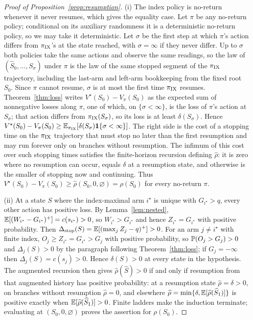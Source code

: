 \begin{proof}[Proof of Proposition~\ref{prop:resumption}]
(i) The index policy is no-return whenever it never resumes, which gives the
equality case. Let $\pi$ be any no-return policy; conditional on its auxiliary randomness it is a deterministic no-return policy, so we may take it deterministic. Let $\sigma$ be the first
step at which $\pi$'s action differs from $\pi_{\rm IX}$'s at the state
reached, with $\sigma=\infty$ if they never differ. Up to $\sigma$ both
policies take the same actions and observe the same readings, so the law of
$(\widehat S_0,\ldots,\widehat S_\sigma)$ under $\pi$ is the law of the same stopped segment of
the $\pi_{\rm IX}$ trajectory, including the last-arm and left-arm bookkeeping
from the fixed root $S_0$. Since $\pi$ cannot resume, $\sigma$ is at most
the first time $\pi_{\rm IX}$ resumes. Theorem~\ref{thm:loss} writes
$V^\star(S_0)-V_\pi(S_0)$ as the expected sum of nonnegative losses along $\pi$,
one of which, on $\{\sigma<\infty\}$, is the loss of $\pi$'s action at
$S_\sigma$; that action differs from $\pi_{\rm IX}(S_\sigma)$, so its loss is at
least $\delta(S_\sigma)$. Hence
$V^\star(S_0)-V_\pi(S_0)\ge\mathbb{E}_{\pi_{\rm IX}}[\delta(S_\sigma)\mathbf 1\{\sigma<\infty\}]$.
The right side is the cost of a stopping time on the $\pi_{\rm IX}$ trajectory
that must stop no later than the first resumption and may run forever only on
branches without resumption. The infimum of this cost over such stopping times
satisfies the finite-horizon recursion defining $\widehat\rho$: it is zero where no
resumption can occur, equals $\delta$ at a resumption state, and otherwise is
the smaller of stopping now and continuing. Thus
$V^\star(S_0)-V_\pi(S_0)\ge\widehat\rho(S_0,0,\varnothing)=\rho(S_0)$
for every no-return $\pi$.

(ii) At a state $S$ where the index-maximal arm $i^\star$ is unique with
$G_{i^\star}>q$, every other action has positive loss. By
Lemma~\ref{lem:nested}, $\mathbb{E}[(W_{i^\star}-G_{i^\star})^+]=c(s_{i^\star})>0$,
so $W_{i^\star}>G_{i^\star}$ and hence $Z_{i^\star}=G_{i^\star}$ with positive
probability. Then $\Delta_{\rm stop}(S)=\mathbb{E}[(\max_jZ_j-q)^+]>0$. For an arm
$j\ne i^\star$ with finite index, $O_j\ge Z_{i^\star}=G_{i^\star}>G_j$ with
positive probability, so $\mathbb{P}(O_j>G_j)>0$ and
$\Delta_j(S)>0$ by the paragraph following Theorem~\ref{thm:loss}; if $G_j=-\infty$
then $\Delta_j(S)=c(s_j)>0$. Hence $\delta(S)>0$ at every state in the
hypothesis. The augmented recursion then gives $\widehat\rho(\widehat S)>0$
if and only if resumption from that augmented history has positive probability:
at a resumption state $\widehat\rho=\delta>0$, on branches without resumption
$\widehat\rho=0$, and elsewhere
$\widehat\rho=\min\{\delta,\mathbb{E}[\widehat\rho(\widehat S_1)]\}$ is positive exactly when
$\mathbb{E}[\widehat\rho(\widehat S_1)]>0$. Finite ladders make the induction terminate;
evaluating at $(S_0,0,\varnothing)$ proves the assertion for $\rho(S_0)$.


\end{proof}
